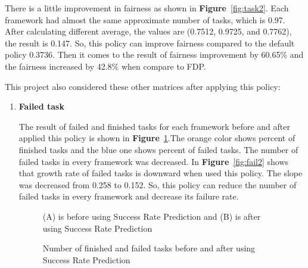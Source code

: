 \documentclass[12pt,oneside,openright,a4paper]{cpe-english-project}
\begin{document}
\hspace{10mm}There is a little improvement in fairness as shown in \textbf{Figure}~\ref{fig:task2}. Each framework had almost the same approximate number of tasks, which is 0.97. After calculating different average, the values are (0.7512, 0.9725, and 0.7762), the result is 0.147. So, this policy can improve fairness compared to the default policy 0.3736. Then it comes to the result of fairness improvement by 60.65\% and the fairness increased by 42.8\% when compare to FDP.
\newline

This project also considered these other matrices after applying this policy:  
\begin{enumerate}

  \item \textbf{Failed task}
  
\hspace{10mm}The result of failed and finished tasks for each framework before and after applied this policy is shown in \textbf{Figure}~\ref{fig:finfail0-2}.The orange color shows percent of finished tasks and the blue one shows percent of failed tasks. The number of failed tasks in every framework was decreased. In \textbf{Figure}~\ref{fig:fail2} shows that growth rate of failed tasks is downward when used this policy. The slope was decreased from 0.258 to 0.152. So, this policy can reduce the number of failed tasks in every framework and decrease its failure rate.
  
  \begin{figure}[!h]\centering
    \setlength{\fboxrule}{0mm} %
    \setlength{\fboxsep}{0cm}
    \caption{Number of finished and failed tasks before and after using Success Rate Prediction}\label{fig:finfail0-2}
    (A) is before using Success Rate Prediction and (B) is  after using Success Rate Prediction
\end{figure}


\end{enumerate}
\end{document}
